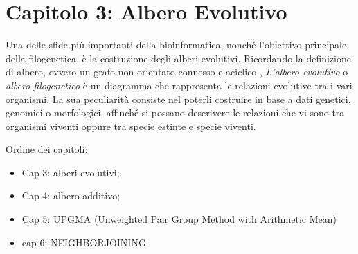 \chapter{Capitolo 3: Albero Evolutivo}
Una delle sfide più importanti della bioinformatica, nonché l'obiettivo principale della filogenetica, è la costruzione degli alberi evolutivi.
\newline
Ricordando la definizione di albero, ovvero un grafo non orientato connesso e aciclico \cite{algoritmiEStruttureDati2}, \textit{L'albero evolutivo} o \textit{albero filogenetico} è un diagramma che rappresenta le relazioni evolutive tra i vari organismi. La sua peculiarità consiste nel poterli costruire in base a dati genetici, genomici o morfologici, affinché si possano descrivere le relazioni che vi sono tra organismi viventi oppure tra specie estinte e specie viventi.


















\newpage
Ordine dei capitoli:
\begin{itemize}
	\item Cap 3: alberi evolutivi;
	\item Cap 4: albero additivo;
	\item Cap 5: UPGMA (Unweighted Pair Group Method with Arithmetic Mean)
	\item cap 6: NEIGHBORJOINING
\end{itemize}

